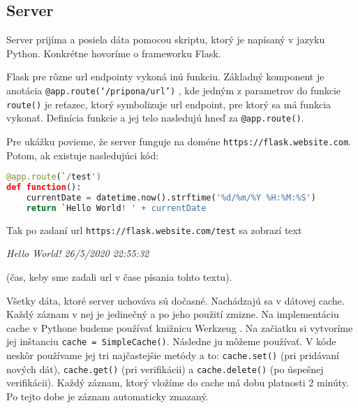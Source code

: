 \subsection{Server}
Server prijíma a posiela dáta pomocou skriptu, ktorý je napísaný v jazyku Python. Konkrétne hovoríme o frameworku Flask.

Flask pre rôzne url endpointy vykoná inú funkciu. Základný komponent je anotácia \texttt{@app.route(`/pripona/url')} \cite{flask_approute}, kde jedným z parametrov do funkcie \texttt{route()} je reťazec, ktorý symbolizuje url endpoint, pre ktorý sa má funkcia vykonať. Definícia funkcie a jej telo nasledujú hneď za \texttt{@app.route()}. 

Pre ukážku povieme, že server funguje na doméne \texttt{https://flask.website.com}. Potom, ak existuje nasledujúci kód:
\newline
\begin{lstlisting}[language=Python, basicstyle=\small]
@app.route(`/test')
def function():
    currentDate = datetime.now().strftime('%d/%m/%Y %H:%M:%S')
    return `Hello World! ' + currentDate
\end{lstlisting}
\leavevmode\newline
Tak po zadaní url \texttt{https://flask.website.com/test} sa zobrazí text

\begin{center}
    \textit{Hello World! 26/5/2020 22:55:32}
\end{center}
(čas, keby sme zadali url v čase písania tohto textu).

Všetky dáta, ktoré server uchováva sú dočasné. Nachádzajú sa v dátovej cache. Každý záznam v nej je jedinečný a po jeho použití zmizne. Na implementáciu cache v Pythone budeme používať knižnicu Werkzeug \cite{werkzeug_cache}. Na začiatku si vytvoríme jej inštanciu \texttt{cache = SimpleCache()}. Následne ju môžeme používať. V kóde neskôr používame jej tri najčastejšie metódy a to: \texttt{cache.set()} (pri pridávaní nových dát), \texttt{cache.get()} (pri verifikácii) a \texttt{cache.delete()} (po úspešnej verifikácii). Každý záznam, ktorý vložíme do cache má dobu platnosti 2 minúty. Po tejto dobe je záznam automaticky zmazaný.
